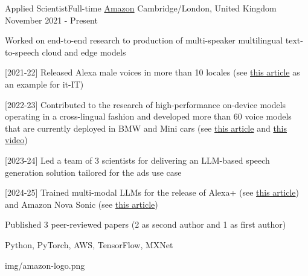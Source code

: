 
\begin{cventries}

  \logocventry
    {Applied Scientist{\enskip\cdotp\enskip}Full-time}
    {\href{https://www.amazon.com/}{Amazon}}
    {Cambridge/London, United Kingdom}
    {November 2021 - Present}
    {
      \begin{cvitems}
        \item {Worked on end-to-end research to production of multi-speaker multilingual text-to-speech cloud and edge models}
        \item {[2021-22] Released Alexa male voices in more than 10 locales (see \textcolor{blue}{\href{https://www.hdblog.it/casa/articoli/n562569/alexa-cambia-voce-maschile-femminile-come-fare/}{this article}} as an example for it-IT)}
        \item {[2022-23] Contributed to the research of high-performance on-device models operating in a cross-lingual fashion and developed more than 60 voice models that are currently deployed in BMW and Mini cars (see \textcolor{blue}{\href{https://www.aboutamazon.com/news/devices/amazon-bmw}{this article}} and \textcolor{blue}{\href{https://www.youtube.com/watch?v=qVOHZ-PsNXw}{this video}})}
        \item {[2023-24] Led a team of 3 scientists for delivering an LLM-based speech generation solution tailored for the ads use case}
        \item {[2024-25] Trained multi-modal LLMs for the release of Alexa+ (see \textcolor{blue}{\href{https://www.aboutamazon.com/news/devices/new-alexa-generative-artificial-intelligence}{this article}}) and Amazon Nova Sonic (see \textcolor{blue}{\href{https://www.aboutamazon.com/news/innovation-at-amazon/nova-sonic-voice-speech-foundation-model}{this article}})}
        \item {Published 3 peer-reviewed papers (2 as second author and 1 as first author)}
      \end{cvitems}
      \cvexptech
        {Python, PyTorch, AWS, TensorFlow, MXNet}
    }
    {img/amazon-logo.png}


\end{cventries}
